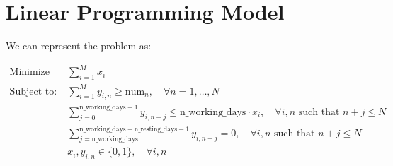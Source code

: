 \documentclass{article}
\begin{document}
\section*{Linear Programming Model}

We can represent the problem as:

\[
\begin{align*}
\text{Minimize} \quad & \sum_{i=1}^{M} x_i \\
\text{Subject to:} \quad & \sum_{i=1}^{M} y_{i,n} \geq \text{num}_n, \quad \forall n = 1, \ldots, N \\
& \sum_{j=0}^{\text{n\_working\_days}-1} y_{i,n+j} \leq \text{n\_working\_days} \cdot x_i, \quad \forall i, n \text{ such that } n+j \leq N \\
& \sum_{j=\text{n\_working\_days}}^{\text{n\_working\_days}+\text{n\_resting\_days}-1} y_{i,n+j} = 0, \quad \forall i, n \text{ such that } n+j \leq N \\
& x_i, y_{i,n} \in \{0, 1\}, \quad \forall i, n
\end{align*}
\]
\end{document}
